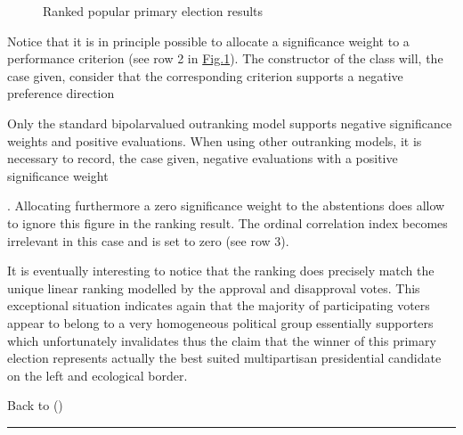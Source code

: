 \documentclass[a4paper,12pt,english]{sphinxhowto}
\let\sphinxpxdimen\pdfpxdimen\else\newdimen\sphinxpxdimen
\begin{document}
\begin{figure}[H]
\centering
\capstart

\noindent\sphinxincludegraphics[width=400\sphinxpxdimen]{{nfRankedPrimPopRes}.png}
\caption{Ranked popular primary election results}\label{\detokenize{pearls:nfrankedprimpopres}}\end{figure}

\sphinxAtStartPar
Notice that it is in principle possible to allocate a  significance weight to a performance criterion (see row 2 in \hyperref[\detokenize{pearls:nfrankedprimpopres}]{Fig.\@ \ref{\detokenize{pearls:nfrankedprimpopres}}}). The constructor of the  class will, the case given, consider that the corresponding criterion supports a negative preference direction %
\begin{footnote}[11]\sphinxAtStartFootnote
Only the standard bipolar\sphinxhyphen{}valued outranking model supports negative significance weights and positive evaluations. When using other outranking models, it is necessary to record, the case given, negative evaluations with a positive significance weight
%
\end{footnote}. Allocating furthermore a zero significance weight to the abstentions does allow to ignore this figure in the ranking result. The ordinal correlation index becomes irrelevant in this case and is set to zero (see row 3).

\sphinxAtStartPar
It is eventually interesting to notice that the  ranking does precisely match the unique linear ranking modelled by the approval and disapproval votes. This exceptional situation indicates again that the majority of participating voters appear to belong to a very homogeneous political group \textendash{}essentially  supporters\textendash{} which unfortunately invalidates thus the claim that the winner of this primary election represents actually the best suited multipartisan presidential candidate on the left and ecological border.

\sphinxAtStartPar
Back to {\hyperref[\detokenize{pearls:pearls-label}]{}} ()


\bigskip\hrule\bigskip
\end{document}
